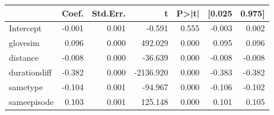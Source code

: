 \begin{tabular}{lrrrrrr}
\toprule
{} &  Coef. &  Std.Err. &         t &  P>|t| &  [0.025 &  0.975] \\
\midrule
Intercept    & -0.001 &     0.001 &    -0.591 &  0.555 &  -0.003 &   0.002 \\
glovesim     &  0.096 &     0.000 &   492.029 &  0.000 &   0.095 &   0.096 \\
distance     & -0.008 &     0.000 &   -36.639 &  0.000 &  -0.008 &  -0.008 \\
durationdiff & -0.382 &     0.000 & -2136.920 &  0.000 &  -0.383 &  -0.382 \\
sametype     & -0.104 &     0.001 &   -94.967 &  0.000 &  -0.106 &  -0.102 \\
sameepisode  &  0.103 &     0.001 &   125.148 &  0.000 &   0.101 &   0.105 \\
\bottomrule
\end{tabular}

